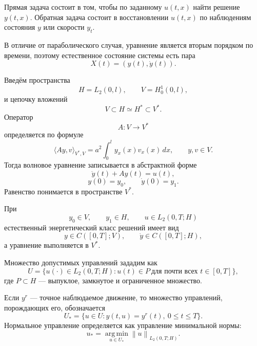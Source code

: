 \documentclass[12pt,a4paper]{article}
\newcommand{\dd}{\,d}
\newcommand{\norm}[1]{\left\lVert #1\right\rVert}
\begin{document}
Прямая задача состоит в том, чтобы по заданному $u(t,x)$ найти решение $y(t,x)$. Обратная задача состоит в восстановлении $u(t,x)$ по наблюдениям состояния $y$ или скорости $y_t$.

В отличие от параболического случая, уравнение является вторым порядком по времени, поэтому естественное состояние системы есть пара
\begin{equation}
    X(t)=(y(t),\dot y(t)).
\end{equation}

Введём пространства
\[
    H=L_2(0,l),\qquad V=H_0^1(0,l),
\]
и цепочку вложений
\begin{equation}
    V\subset H\simeq H^*\subset V^*.
\end{equation}
Оператор
\[
    A:V\to V^*
\]
определяется по формуле
\begin{equation}
    \langle Ay,v\rangle_{V^*,V}
    =a^2\int_0^l y_x(x)v_x(x)\dd x,
    \qquad y,v\in V.
\end{equation}
Тогда волновое уравнение записывается в абстрактной форме
\begin{equation}
    \ddot y(t)+Ay(t)=u(t),
\end{equation}
\begin{equation}
    y(0)=y_0,
    \qquad \dot y(0)=y_1.
\end{equation}
Равенство понимается в пространстве $V^*$.

При
\[
    y_0\in V,
    \qquad y_1\in H,
    \qquad u\in L_2(0,T;H)
\]
естественный энергетический класс решений имеет вид
\begin{equation}
    y\in C([0,T];V),
    \qquad \dot y\in C([0,T];H),
\end{equation}
а уравнение выполняется в $V^*$.

Множество допустимых управлений зададим как
\begin{equation}
    U=\{u(\cdot)\in L_2(0,T;H): u(t)\in P\ \text{для почти всех }t\in[0,T]\},
\end{equation}
где $P\subset H$ --- выпуклое, замкнутое и ограниченное множество.

Если $y^r$ --- точное наблюдаемое движение, то множество управлений, порождающих его, обозначается
\begin{equation}
    U_* = \{u\in U:y(t,u)=y^r(t),\ 0\le t\le T\}.
\end{equation}
Нормальное управление определяется как управление минимальной нормы:
\begin{equation}
    u_* = \operatorname*{arg\,min}_{u\in U_*}\norm{u}_{L_2(0,T;H)}.
\end{equation}
\end{document}
